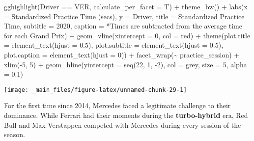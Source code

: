 \documentclass[
]{book}
\newenvironment{Shaded}{\begin{snugshade}}{\end{snugshade}}
\newcommand{\AttributeTok}[1]{\textcolor[rgb]{0.77,0.63,0.00}{#1}}
\newcommand{\DecValTok}[1]{\textcolor[rgb]{0.00,0.00,0.81}{#1}}
\newcommand{\FloatTok}[1]{\textcolor[rgb]{0.00,0.00,0.81}{#1}}
\newcommand{\FunctionTok}[1]{\textcolor[rgb]{0.00,0.00,0.00}{#1}}
\newcommand{\NormalTok}[1]{#1}
\newcommand{\SpecialCharTok}[1]{\textcolor[rgb]{0.00,0.00,0.00}{#1}}
\newcommand{\StringTok}[1]{\textcolor[rgb]{0.31,0.60,0.02}{#1}}
\begin{document}
\begin{Shaded}
\begin{Highlighting}[]
  \FunctionTok{gghighlight}\NormalTok{(Driver }\SpecialCharTok{==} \StringTok{\textquotesingle{}VER\textquotesingle{}}\NormalTok{, }\AttributeTok{calculate\_per\_facet =}\NormalTok{ T) }\SpecialCharTok{+} 
   \FunctionTok{theme\_bw}\NormalTok{() }\SpecialCharTok{+}
   \FunctionTok{labs}\NormalTok{(}\AttributeTok{x =} \StringTok{\textquotesingle{}Standardized Practice Time (secs)\textquotesingle{}}\NormalTok{,}
        \AttributeTok{y =} \StringTok{\textquotesingle{}Driver\textquotesingle{}}\NormalTok{,}
        \AttributeTok{title =} \StringTok{\textquotesingle{}Standardized Practice Time\textquotesingle{}}\NormalTok{,}
        \AttributeTok{subtitle =} \StringTok{\textquotesingle{}2020\textquotesingle{}}\NormalTok{,}
        \AttributeTok{caption =} \StringTok{\textquotesingle{}*Times are subtracted from the average time for each Grand Prix\textquotesingle{}}\NormalTok{) }\SpecialCharTok{+}
   \FunctionTok{geom\_vline}\NormalTok{(}\AttributeTok{xintercept =} \DecValTok{0}\NormalTok{, }\AttributeTok{col =} \StringTok{\textquotesingle{}red\textquotesingle{}}\NormalTok{) }\SpecialCharTok{+}
   \FunctionTok{theme}\NormalTok{(}\AttributeTok{plot.title =} \FunctionTok{element\_text}\NormalTok{(}\AttributeTok{hjust =} \FloatTok{0.5}\NormalTok{),}
         \AttributeTok{plot.subtitle =} \FunctionTok{element\_text}\NormalTok{(}\AttributeTok{hjust =} \FloatTok{0.5}\NormalTok{),}
         \AttributeTok{plot.caption =} \FunctionTok{element\_text}\NormalTok{(}\AttributeTok{hjust =} \DecValTok{0}\NormalTok{)) }\SpecialCharTok{+}
  \FunctionTok{facet\_wrap}\NormalTok{(}\SpecialCharTok{\textasciitilde{}}\NormalTok{ practice\_session) }\SpecialCharTok{+}
  \FunctionTok{xlim}\NormalTok{(}\SpecialCharTok{{-}}\DecValTok{5}\NormalTok{, }\DecValTok{5}\NormalTok{) }\SpecialCharTok{+}
  \FunctionTok{geom\_hline}\NormalTok{(}\AttributeTok{yintercept =} \FunctionTok{seq}\NormalTok{(}\DecValTok{22}\NormalTok{, }\DecValTok{1}\NormalTok{, }\SpecialCharTok{{-}}\DecValTok{2}\NormalTok{), }\AttributeTok{col =} \StringTok{\textquotesingle{}grey\textquotesingle{}}\NormalTok{, }\AttributeTok{size =} \DecValTok{5}\NormalTok{, }\AttributeTok{alpha =}  \FloatTok{0.1}\NormalTok{)}
\end{Highlighting}
\end{Shaded}

\begin{center}\texttt{[image: \_main\_files/figure-latex/unnamed-chunk-29-1]} \end{center}

For the first time since 2014, Mercedes faced a legitimate challenge to their dominance. While Ferrari had their moments during the \textbf{turbo-hybrid} era, Red Bull and Max Verstappen competed with Mercedes during every session of the season.
\end{document}
